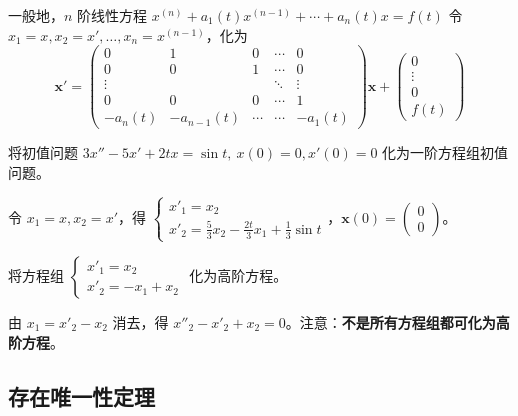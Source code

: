 一般地，$n$ 阶线性方程 $x^{(n)} + a_1(t)x^{(n-1)} + \cdots + a_n(t)x = f(t)$ 令 $x_1 = x, x_2 = x', \ldots, x_n = x^{(n-1)}$，化为
\begin{equation}\mathbf{x}' = \begin{pmatrix} 0 & 1 & 0 & \cdots & 0 \\ 0 & 0 & 1 & \cdots & 0 \\ \vdots & & & \ddots & \vdots \\ 0 & 0 & 0 & \cdots & 1 \\ -a_n(t) & -a_{n-1}(t) & \cdots & \cdots & -a_1(t) \end{pmatrix}\mathbf{x} + \begin{pmatrix} 0 \\ \vdots \\ 0 \\ f(t) \end{pmatrix} \tag{5.7}\end{equation}

\begin{example}
将初值问题 $3x'' - 5x' + 2tx = \sin t, \ x(0) = 0, x'(0) = 0$ 化为一阶方程组初值问题。
\end{example}

\begin{solution}
令 $x_1 = x, x_2 = x'$，得 $\begin{cases} x'_1 = x_2 \\ x'_2 = \frac{5}{3}x_2 - \frac{2t}{3}x_1 + \frac{1}{3}\sin t \end{cases}$，$\mathbf{x}(0) = \begin{pmatrix} 0 \\ 0 \end{pmatrix}$。
\end{solution}

\begin{example}
将方程组 $\begin{cases} x'_1 = x_2 \\ x'_2 = -x_1 + x_2 \end{cases}$ 化为高阶方程。
\end{example}

\begin{solution}
由 $x_1 = x'_2 - x_2$ 消去，得 $x''_2 - x'_2 + x_2 = 0$。注意：\textbf{不是所有方程组都可化为高阶方程}。
\end{solution}

\subsection{存在唯一性定理}

